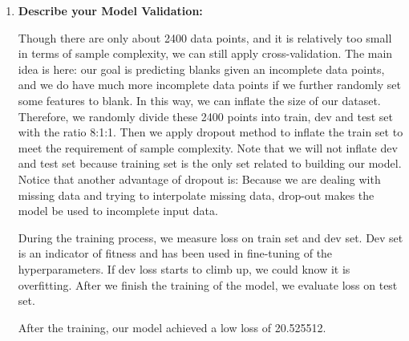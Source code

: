 \documentclass[11pt, a4paper]{article}
\begin{document}
\begin{enumerate}
	\item {\textbf{Describe your Model Validation:}}
	\par{Though there are only about 2400 data points, and it is relatively too small in terms of sample complexity, we can still apply cross-validation. The main idea is here: our goal is predicting blanks given an incomplete data points, and we do have much more incomplete data points if we further randomly set some features to blank. In this way, we can inflate the size of our dataset. Therefore, we randomly divide these 2400 points into train, dev and test set with the ratio 8:1:1. Then we apply dropout method to inflate the train set to meet the requirement of sample complexity. Note that we will not inflate dev and test set because training set is the only set related to building our model. Notice that another advantage of dropout is: Because we are dealing with missing data and trying to interpolate missing data, drop-out makes the model be used to incomplete input data.
}
	\par{During the training process, we measure loss on train set and dev set. Dev set is an indicator of fitness and has been used in fine-tuning of the hyperparameters. If dev loss starts to climb up, we could know it is overfitting. After we finish the training of the model, we evaluate loss on test set.
}
	\par{After the training, our model achieved a low loss of 20.525512.}
	

\end{enumerate}
\end{document}
